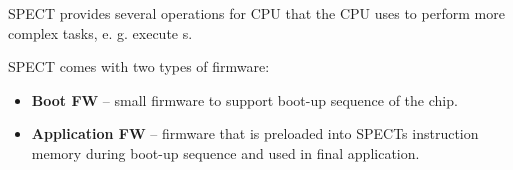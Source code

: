 \newcommand{\SPECTCommandHead}[2]{
    \multicolumn{4}{|X}{\cellcolor{TropicBlue}\color{white}\textbf{#1}} &
    \multicolumn{1}{|>{\hsize=0.5\hsize}X}{\cellcolor{TropicBlue!70}\color{white}\Register{SPECT_OP_ID}:} &
    \multicolumn{1}{|>{\hsize=0.5\hsize}X|}{\cellcolor{TropicBlue!70}\color{white}#2} \\ \hline
}

\newcommand{\SPECTCommandDescription}[1]{
    \multicolumn{6}{|p{.9\textwidth}|}{#1} \\ \hline
}

\newcommand{\SPECTCommandMemHead}[1]{
    \rowcolor{gray!70}
    \multicolumn{6}{|c|}{\color{white}#1} \\ \hline
}

\newcommand{\SPECTCommandMem}[3]{
    \multicolumn{1}{|>{\hsize=0.2\hsize}X}{#1} &
    \multicolumn{1}{|>{\hsize=0.2\hsize}X}{#2} &
    \multicolumn{4}{|>{\hsize=1.5\hsize}X|}{#3} \\ \hline
}

\newcommand{\SPECTCommandCtx}[2]{
    \rowcolor{gray!70}
    \multicolumn{3}{|X}{\color{white}Context In} & \multicolumn{3}{|X|}{\color{white}Context Out} \\ \hline
    \multicolumn{3}{|X}{#1} & \multicolumn{3}{|X|}{#2} \\ \hline
}

\newcommand{\SPECTCommandTable}[1]{
    \begin{xltabular}{\textwidth}{|XXXXXX|}
    \hline
    #1
    \end{xltabular}
}


SPECT provides several operations for CPU that the CPU uses to perform more complex tasks, e. g. execute \LLLCMD{}s.

SPECT comes with two types of firmware:
\begin{itemize}
    \item \textbf{Boot FW} -- small firmware to support boot-up sequence of the chip.
    \item \textbf{Application FW} -- firmware that is preloaded into SPECTs instruction memory during
                                     boot-up sequence and used in final application.
\end{itemize}

\vspace{.3cm}


